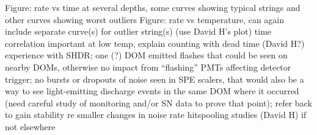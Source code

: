 Figure: rate vs time at several depths, some curves showing typical strings and other curves showing worst outliers
Figure: rate vs temperature, can again include separate curve(s) for outlier string(s) (use David H’s plot)
time correlation important at low temp, explain counting with dead time (David H?)
experience with SHDR; one (?) DOM emitted flashes that could be seen on nearby DOMs, otherwise no impact from “flashing” PMTs affecting detector trigger; no bursts or dropouts of noise seen in SPE scalers, that would also be a way to see light-emitting discharge events in the same DOM where it occurred (need careful study of monitoring and/or SN data to prove that point); refer back to gain stability re smaller changes in noise rate
hitspooling studies (David H) if not elsewhere
